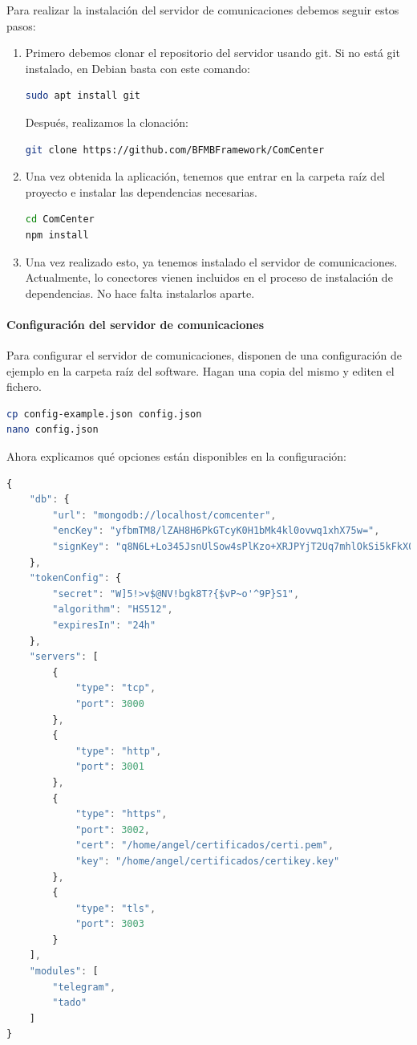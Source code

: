 \documentclass[spanish,12pt, a4paper, twoside]{paper}
\begin{document}
Para realizar la instalación del servidor de comunicaciones debemos seguir estos pasos:

\begin{enumerate}
\item Primero debemos clonar el repositorio del servidor usando git. Si no está git instalado, en Debian basta con este comando:
\begin{lstlisting}[language=sh]
sudo apt install git
\end{lstlisting}

Después, realizamos la clonación:
\begin{lstlisting}[language=sh]
git clone https://github.com/BFMBFramework/ComCenter
\end{lstlisting}

\item Una vez obtenida la aplicación, tenemos que entrar en la carpeta raíz del proyecto e instalar las dependencias necesarias.
\begin{lstlisting}[language=sh]
cd ComCenter
npm install
\end{lstlisting}

\item Una vez realizado esto, ya tenemos instalado el servidor de comunicaciones. Actualmente, lo conectores vienen incluidos en el proceso de instalación de dependencias. No hace falta instalarlos aparte.
\end{enumerate}

\paragraph{Configuración del servidor de comunicaciones}

Para configurar el servidor de comunicaciones, disponen de una configuración de ejemplo en la carpeta raíz del software. Hagan una copia del mismo y editen el fichero.

\begin{lstlisting}[language=sh]
cp config-example.json config.json
nano config.json
\end{lstlisting}

Ahora explicamos qué opciones están disponibles en la configuración:
\begin{lstlisting}[language=Javascript]
{
	"db": {
		"url": "mongodb://localhost/comcenter",
		"encKey": "yfbmTM8/lZAH8H6PkGTcyK0H1bMk4kl0ovwq1xhX75w=",
		"signKey": "q8N6L+Lo345JsnUlSow4sPlKzo+XRJPYjT2Uq7mhlOkSi5kFkX0UoIY3etfm4UxtNHaM8xaX2HtkAhV7Gye0KA=="
	},
	"tokenConfig": {
		"secret": "W]5!>v$@NV!bgk8T?{$vP~o'^9P}S1",
		"algorithm": "HS512",
		"expiresIn": "24h"
	},
	"servers": [
		{
			"type": "tcp",
			"port": 3000
		},
		{
			"type": "http",
			"port": 3001
		},
		{
			"type": "https",
			"port": 3002,
			"cert": "/home/angel/certificados/certi.pem",
			"key": "/home/angel/certificados/certikey.key"
		},
		{
			"type": "tls",
			"port": 3003
		}
	],
	"modules": [
		"telegram",
		"tado"
	]
}
\end{lstlisting}
\end{document}
